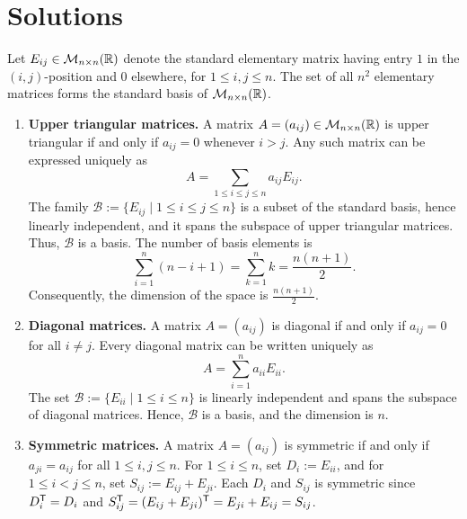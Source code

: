 \section{Solutions}
\label{sec:solutions_dimension}

\begin{exercisesolution*}
\label{sol:matrix_subspaces_dimension_bases}
Let $E_{ij} \in \mathcal{M}_{n \times n}(\mathbb{R})$ denote the standard elementary matrix having entry $1$ in the $(i, j)$-position and $0$ elsewhere, for $1 \le i, j \le n$. The set of all $n^2$ elementary matrices forms the standard basis of $\mathcal{M}_{n \times n}(\mathbb{R})$.

\begin{enumerate}[label=\textbf{(\alph*)}]
    \item \textbf{Upper triangular matrices.} A matrix $A = (a_{ij}) \in \mathcal{M}_{n \times n}(\mathbb{R})$ is upper triangular if and only if $a_{ij} = 0$ whenever $i > j$. Any such matrix can be expressed uniquely as
    \[
        A = \sum_{1 \le i \le j \le n} a_{ij} E_{ij}.
    \]
    The family $\mathcal{B} := \{E_{ij} \mid 1 \le i \le j \le n\}$ is a subset of the standard basis, hence linearly independent, and it spans the subspace of upper triangular matrices. Thus, $\mathcal{B}$ is a basis. The number of basis elements is
    \[
        \sum_{i=1}^n (n - i + 1) = \sum_{k=1}^n k = \frac{n(n+1)}{2}.
    \]
    Consequently, the dimension of the space is $\frac{n(n+1)}{2}$.

    \item \textbf{Diagonal matrices.} A matrix $A = (a_{ij})$ is diagonal if and only if $a_{ij} = 0$ for all $i \neq j$. Every diagonal matrix can be written uniquely as
    \[
        A = \sum_{i=1}^n a_{ii} E_{ii}.
    \]
    The set $\mathcal{B} := \{E_{ii} \mid 1 \le i \le n\}$ is linearly independent and spans the subspace of diagonal matrices. Hence, $\mathcal{B}$ is a basis, and the dimension is $n$.

    \item \textbf{Symmetric matrices.} A matrix $A = (a_{ij})$ is symmetric if and only if $a_{ji} = a_{ij}$ for all $1 \le i, j \le n$. For $1 \le i \le n$, set $D_i := E_{ii}$, and for $1 \le i < j \le n$, set $S_{ij} := E_{ij} + E_{ji}$. Each $D_i$ and $S_{ij}$ is symmetric since $D_i^{\mathsf{T}} = D_i$ and $S_{ij}^{\mathsf{T}} = (E_{ij} + E_{ji})^{\mathsf{T}} = E_{ji} + E_{ij} = S_{ij}$.
    

\end{enumerate}
\end{exercisesolution*}

